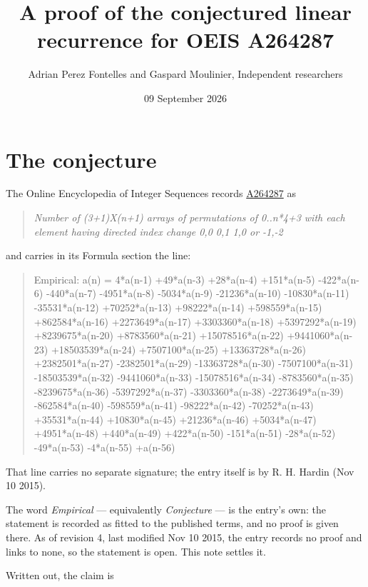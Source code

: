 \documentclass[11pt]{article}
\title{A proof of the conjectured linear recurrence for OEIS A264287}
\author{Adrian Perez Fontelles and Gaspard Moulinier, Independent researchers}
\date{09 September 2026}
\theoremstyle{definition}
\begin{document}
\maketitle
\section{The conjecture}

The Online Encyclopedia of Integer Sequences records \href{https://oeis.org/A264287}{A264287} as

\begin{quote}\itshape Number of (3+1)X(n+1) arrays of permutations of 0..n*4+3 with each element having directed index change 0,0 0,1 1,0 or -1,-2\end{quote}

and carries in its Formula section the line:

\begin{quote}\ttfamily Empirical: a(n) = 4*a(n-1) +49*a(n-3) +28*a(n-4) +151*a(n-5) -422*a(n-6) -440*a(n-7) -4951*a(n-8) -5034*a(n-9) -21236*a(n-10) -10830*a(n-11) -35531*a(n-12) +70252*a(n-13) +98222*a(n-14) +598559*a(n-15) +862584*a(n-16) +2273649*a(n-17) +3303360*a(n-18) +5397292*a(n-19) +8239675*a(n-20) +8783560*a(n-21) +15078516*a(n-22) +9441060*a(n-23) +18503539*a(n-24) +7507100*a(n-25) +13363728*a(n-26) +2382501*a(n-27) -2382501*a(n-29) -13363728*a(n-30) -7507100*a(n-31) -18503539*a(n-32) -9441060*a(n-33) -15078516*a(n-34) -8783560*a(n-35) -8239675*a(n-36) -5397292*a(n-37) -3303360*a(n-38) -2273649*a(n-39) -862584*a(n-40) -598559*a(n-41) -98222*a(n-42) -70252*a(n-43) +35531*a(n-44) +10830*a(n-45) +21236*a(n-46) +5034*a(n-47) +4951*a(n-48) +440*a(n-49) +422*a(n-50) -151*a(n-51) -28*a(n-52) -49*a(n-53) -4*a(n-55) +a(n-56)\end{quote}

That line carries no separate signature; the entry itself is by R. H. Hardin (Nov 10 2015).

The word {\itshape Empirical} --- equivalently {\itshape Conjecture} --- is the entry's own: the statement is recorded as fitted to the published terms, and no proof is given there. As of revision 4, last modified Nov 10 2015, the entry records no proof and links to none, so the statement is open. This note settles it.

Written out, the claim is
\end{document}
